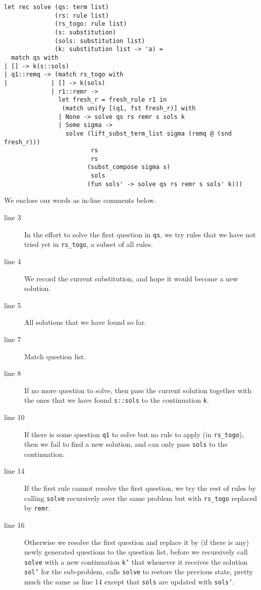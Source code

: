 \documentclass{article}
\begin{document}
\begin{verbatim}
let rec solve (qs: term list)
              (rs: rule list) 
              (rs_togo: rule list) 
              (s: substitution) 
              (sols: substitution list) 
              (k: substitution list -> 'a) =
  match qs with
| [] -> k(s::sols)
| q1::remq -> (match rs_togo with
|            | [] -> k(sols)
             | r1::remr -> 
               let fresh_r = fresh_rule r1 in
                (match unify [(q1, fst fresh_r)] with
               | None -> solve qs rs remr s sols k
               | Some sigma -> 
                 solve (lift_subst_term_list sigma (remq @ (snd fresh_r)))
                        rs
                        rs 
                       (subst_compose sigma s) 
                        sols 
                       (fun sols' -> solve qs rs remr s sols' k)))
\end{verbatim}

We enclose our words as in-line comments below.
\begin{description}
	\item[line 3] In the effort to solve the first question in {\tt qs}, we try rules that we have not tried yet in {\tt rs\_togo}, a subset of all rules. 
	\item[line 4] We record the current substitution, and hope it would become a new solution.
	\item[line 5] All solutions that we have found so far.
	\item[line 7] Match question list.
	\item[line 8] If no more question to solve, then pass the current solution together with the ones that we have found {\tt s::sols} to the continuation {\tt k}.
	\item[line 10] If there is some question {\tt q1} to solve but no rule to apply (in {\tt rs\_togo}), then we fail to find a new solution, and can only pass {\tt sols} to the continuation.
	\item[line 14] If the first rule cannot resolve the first question, we try the rest of rules by calling {\tt solve} recursively over the same problem but with {\tt rs\_togo} replaced by {\tt remr}.
	\item[line 16] Otherwise we resolve the first question and replace it by (if there is any) newly generated questions to the question list, before we recursively call {\tt solve} with a new continuation {\tt k'} that whenever it receives the solution {\tt sol'} for the sub-problem, calls {\tt solve} to restore the previous state, pretty much the same as line 14 except that {\tt sols} are updated with {\tt sols'}.
\end{description}
\end{document}
